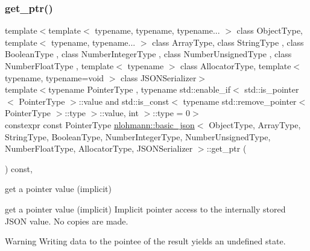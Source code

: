 \subsubsection{\texorpdfstring{get\+\_\+ptr()}{get\_ptr()}\hspace{0.1cm}{\footnotesize\ttfamily [2/2]}}
{\footnotesize\ttfamily template$<$template$<$ typename, typename, typename... $>$ class Object\+Type, template$<$ typename, typename... $>$ class Array\+Type, class String\+Type , class Boolean\+Type , class Number\+Integer\+Type , class Number\+Unsigned\+Type , class Number\+Float\+Type , template$<$ typename $>$ class Allocator\+Type, template$<$ typename, typename=void $>$ class J\+S\+O\+N\+Serializer$>$ \\
template$<$typename Pointer\+Type , typename std\+::enable\+\_\+if$<$ std\+::is\+\_\+pointer$<$ Pointer\+Type $>$\+::value and std\+::is\+\_\+const$<$ typename std\+::remove\+\_\+pointer$<$ Pointer\+Type $>$\+::type $>$\+::value, int $>$\+::type  = 0$>$ \\
constexpr const Pointer\+Type \hyperlink{classnlohmann_1_1basic__json}{nlohmann\+::basic\+\_\+json}$<$ Object\+Type, Array\+Type, String\+Type, Boolean\+Type, Number\+Integer\+Type, Number\+Unsigned\+Type, Number\+Float\+Type, Allocator\+Type, J\+S\+O\+N\+Serializer $>$\+::get\+\_\+ptr (\begin{DoxyParamCaption}{ }\end{DoxyParamCaption}) const\hspace{0.3cm}{\ttfamily [inline]}, {\ttfamily [noexcept]}}



get a pointer value (implicit) 

get a pointer value (implicit) Implicit pointer access to the internally stored J\+S\+ON value. No copies are made.

\begin{DoxyWarning}{Warning}
Writing data to the pointee of the result yields an undefined state.
\end{DoxyWarning}

